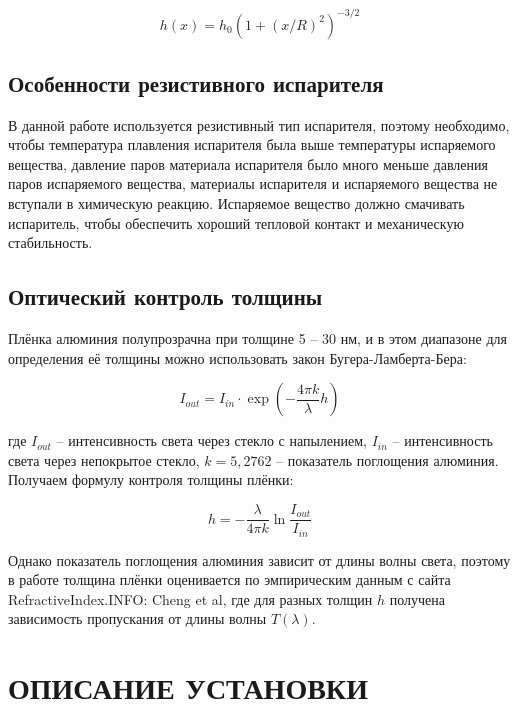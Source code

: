 \documentclass[a4paper, 14pt]{extarticle}
\begin{document}
	\begin{equation}
		h(x) = h_0(1 + (x/R)^2)^{-3/2}
	\end{equation}
	
	\subsection{Особенности резистивного испарителя}
	
	\hspace{11mm} В данной работе используется резистивный тип испарителя, поэтому необходимо, чтобы температура плавления испарителя была выше температуры испаряемого вещества, давление паров материала испарителя было много меньше давления паров испаряемого вещества, материалы испарителя и испаряемого вещества не вступали в химическую реакцию. Испаряемое вещество должно смачивать испаритель, чтобы обеспечить хороший тепловой контакт и механическую стабильность.
	
	\subsection{Оптический контроль толщины}
	
	\hspace{11mm} Плёнка алюминия полупрозрачна при толщине 5 -- 30 нм, и в этом диапазоне для определения её толщины можно использовать закон Бугера-Ламберта-Бера:
	
	\begin{equation}
		I_{out} = I_{in} \cdot \exp(-\frac{4\pi k}{\lambda} h)
	\end{equation}
	
	где $I_{out}$ -- интенсивность света через стекло с напылением, $I_{in}$ -- интенсивность света через непокрытое стекло, $k = 5,2762$ -- показатель поглощения алюминия. Получаем формулу контроля толщины плёнки:
	
	\begin{equation}
		h = -\frac{\lambda}{4\pi k} \ln{\frac{I_{out}}{I_{in}}} 
	\end{equation}
	
	Однако показатель поглощения алюминия зависит от длины волны света, поэтому в работе толщина плёнки оценивается по эмпирическим данным с сайта RefractiveIndex.INFO: Cheng et al, где для разных толщин $h$ получена зависимость пропускания от длины волны $T(\lambda)$. 
	
	
	
	
	\section{ОПИСАНИЕ УСТАНОВКИ}
	
\end{document}
